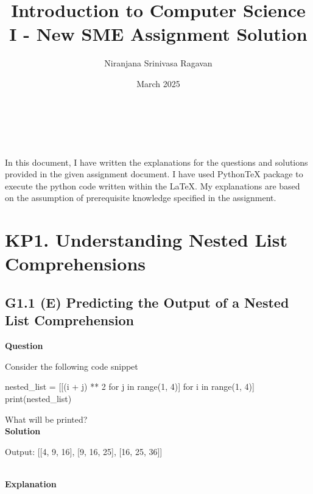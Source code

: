 \documentclass[10pt]{extarticle}
\title{Introduction to Computer Science I - New SME Assignment Solution}
\author{Niranjana Srinivasa Ragavan}
\date{March 2025}
\makeatletter
\renewcommand\maketitle{
    \null\vspace{4mm}
    \begin{center}
        {\Huge\sffamily\bfseries\selectfont\@title}\\
            \vspace{4mm}
        {\Large\sffamily\selectfont\@author}\\
            \vspace{4mm}
        {\large\sffamily\selectfont\@date}
    \end{center}
    \vspace{6mm}
}
\makeatother
\begin{document}
\maketitle

In this document, I have written the explanations for the questions and solutions provided in the given assignment document. I have used PythonTeX package to execute the python code written within the LaTeX.
My explanations are based on the assumption of prerequisite knowledge specified in the assignment.

\section*{KP1. Understanding Nested List Comprehensions}
\subsection*{G1.1 (E) Predicting the Output of a Nested List Comprehension}

\textbf{Question}

Consider the following code snippet

    \begin{python}
    nested_list = [[(i + j) ** 2 for j in range(1, 4)] for i in range(1, 4)]
    print(nested_list)
    \end{python}

What will be printed? \\

\noindent\textbf{Solution}

\begin{python}
Output: [[4, 9, 16], [9, 16, 25], [16, 25, 36]]
\end{python}  \\

\noindent\textbf{Explanation} \\
\end{document}
